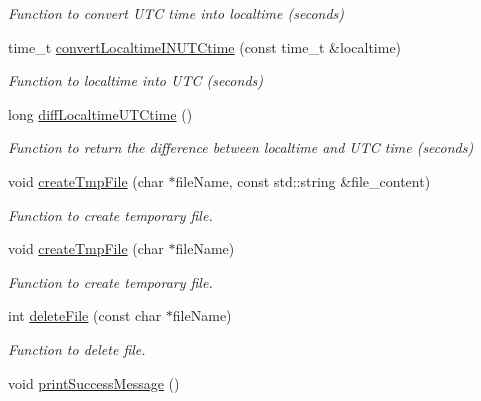 \begin{DoxyCompactItemize}
\begin{DoxyCompactList}\small\item\em Function to convert UTC time into localtime (seconds) \item\end{DoxyCompactList}\item 
time\_\-t \hyperlink{namespacevishnu_a7607f0891ab382dcb2343a36d9b25190}{convertLocaltimeINUTCtime} (const time\_\-t \&localtime)
\begin{DoxyCompactList}\small\item\em Function to localtime into UTC (seconds) \item\end{DoxyCompactList}\item 
long \hyperlink{namespacevishnu_a34f4596f7c86c2f9bd6b6bd49be69e6f}{diffLocaltimeUTCtime} ()
\begin{DoxyCompactList}\small\item\em Function to return the difference between localtime and UTC time (seconds) \item\end{DoxyCompactList}\item 
void \hyperlink{namespacevishnu_a33f3fca5bc294663e2863c1abc1da5c8}{createTmpFile} (char $\ast$fileName, const std::string \&file\_\-content)
\begin{DoxyCompactList}\small\item\em Function to create temporary file. \item\end{DoxyCompactList}\item 
void \hyperlink{namespacevishnu_a18002572e5b0039069544475365f335d}{createTmpFile} (char $\ast$fileName)
\begin{DoxyCompactList}\small\item\em Function to create temporary file. \item\end{DoxyCompactList}\item 
int \hyperlink{namespacevishnu_adccbbcf352ca9471d210e9d801c73e2d}{deleteFile} (const char $\ast$fileName)
\begin{DoxyCompactList}\small\item\em Function to delete file. \item\end{DoxyCompactList}\item 
\hypertarget{namespacevishnu_ab0ea8ccb86c430f6a602374c82f66d2e}{
void \hyperlink{namespacevishnu_ab0ea8ccb86c430f6a602374c82f66d2e}{printSuccessMessage} ()}
\label{namespacevishnu_ab0ea8ccb86c430f6a602374c82f66d2e}


\end{DoxyCompactItemize}
